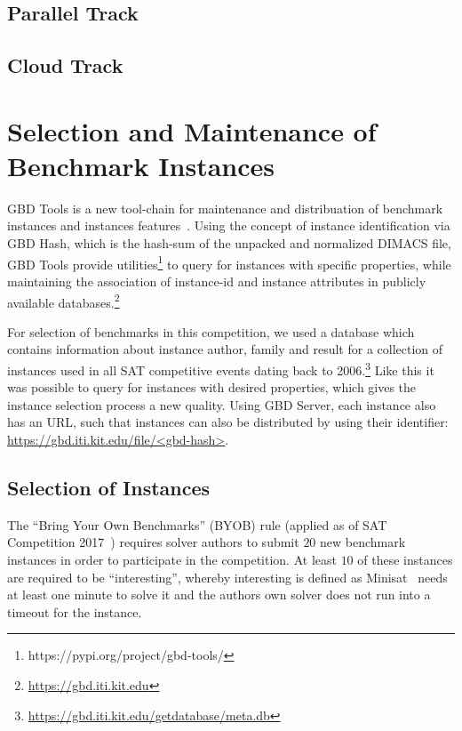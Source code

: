 \documentclass{elsarticle}
\begin{document}
\subsection{Parallel Track}

\subsection{Cloud Track}


\section{Selection and Maintenance of Benchmark Instances}

GBD Tools is a new tool-chain for maintenance and distribuation of benchmark instances and instances features~\cite{Iser:2018:GBD}. 
Using the concept of instance identification via GBD Hash, which is the hash-sum of the unpacked and normalized DIMACS file, GBD Tools provide utilities\footnote{https://pypi.org/project/gbd-tools/} to query for instances with specific properties, while maintaining the association of instance-id and instance attributes in publicly available databases.\footnote{\url{https://gbd.iti.kit.edu}}

For selection of benchmarks in this competition, we used a database which contains information about instance author, family and result for a collection of instances used in all SAT competitive events dating back to 2006.\footnote{\url{https://gbd.iti.kit.edu/getdatabase/meta.db}} 
Like this it was possible to query for instances with desired properties, which gives the instance selection process a new quality. 
Using GBD Server, each instance also has an URL, such that instances can also be distributed by using their identifier: \url{https://gbd.iti.kit.edu/file/<gbd-hash>}.


\subsection{Selection of Instances}

The ``Bring Your Own Benchmarks'' (BYOB) rule (applied as of SAT Competition 2017~\cite{SC2017}) requires solver authors to submit $20$ new benchmark instances in order to participate in the competition. At least $10$ of these instances are required to be ``interesting'', whereby interesting is defined as Minisat~\cite{Niklas:2003:Minisat} needs at least one minute to solve it and the authors own solver does not run into a timeout for the instance. 
\end{document}
